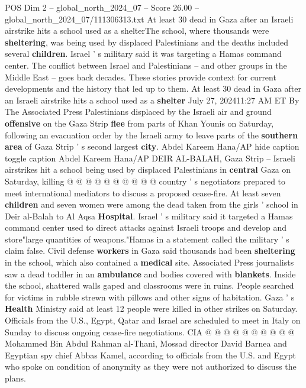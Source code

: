 \begin{textsample}{POS Dim 2 – global\_north\_2024\_07 – Score 26.00 – global\_north\_2024\_07/111306313.txt}  \label{ex:f2_pos_390}
At least 30 dead in Gaza after an Israeli airstrike hits a school used as a shelterThe school, where thousands were \textbf{sheltering}, was being used by displaced Palestinians and the deaths included several \textbf{children}.
Israel ' s military said it was targeting a Hamas command center.
The conflict between Israel and Palestinians -- and other groups in the Middle East -- goes back decades.
These stories provide context for current developments and the history that led up to them.
At least 30 dead in Gaza after an Israeli airstrike hits a school used as a \textbf{shelter} July 27, 202411:27 AM ET By The Associated Press Palestinians displaced by the Israeli air and ground \textbf{offensive} on the Gaza Strip \textbf{flee} from parts of Khan Younis on Saturday, following an evacuation order by the Israeli army to leave parts of the \textbf{southern} \textbf{area} of Gaza Strip ' s second largest \textbf{city}.
Abdel Kareem Hana/AP hide caption toggle caption Abdel Kareem Hana/AP DEIR AL-BALAH, Gaza Strip -- Israeli airstrikes hit a school being used by displaced Palestinians in \textbf{central} Gaza on Saturday, killing @ @ @ @ @ @ @ @ @ @ country ' s negotiators prepared to meet international mediators to discuss a proposed cease-fire.
At least seven \textbf{children} and seven women were among the dead taken from the girls ' school in Deir al-Balah to Al Aqsa \textbf{Hospital}.
Israel ' s military said it targeted a Hamas command center used to direct attacks against Israeli troops and develop and store"large quantities of weapons."Hamas in a statement called the military ' s claim false.
Civil defense \textbf{workers} in Gaza said thousands had been \textbf{sheltering} in the school, which also contained a \textbf{medical} site.
Associated Press journalists saw a dead toddler in an \textbf{ambulance} and bodies covered with \textbf{blankets}.
Inside the school, shattered walls gaped and classrooms were in ruins.
People searched for victims in rubble strewn with pillows and other signs of habitation.
Gaza ' s \textbf{Health} Ministry said at least 12 people were killed in other strikes on Saturday.
Officials from the U.S., Egypt, Qatar and Israel are scheduled to meet in Italy on Sunday to discuss ongoing cease-fire negotiations.
CIA @ @ @ @ @ @ @ @ @ @ Mohammed Bin Abdul Rahman al-Thani, Mossad director David Barnea and Egyptian spy chief Abbas Kamel, according to officials from the U.S. and Egypt who spoke on condition of anonymity as they were not authorized to discuss the plans.

\end{textsample}

